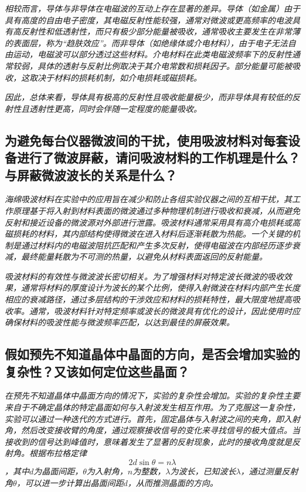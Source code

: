 \documentclass[UTF-8,twoside,cs4size]{ctexart}
\begin{document}
\textit{相较而言，导体与非导体在电磁波的互动上存在显著的差异。导体（如金属）由于具有高度的自由电子密度，其电磁反射性能较强，通常对微波或更高频率的电波具有高反射性和低透射性，而只有极少部分能量被吸收，通常吸收主要发生在非常薄的表面层，称为“趋肤效应”。而非导体（如绝缘体或介电材料），由于电子无法自由运动，电磁波可以部分透过这些材料。介电材料在此类电磁波频率下的反射性通常较弱，具体的透射与反射比例取决于其介电常数和损耗因子。部分能量可能被吸收，这取决于材料的损耗机制，如介电损耗或磁损耗。}

\textit{因此，总体来看，导体具有极高的反射性且吸收能量极少，而非导体具有较低的反射性且透射性更高，同时会伴随一定程度的能量吸收。}

\subsection{为避免每台仪器微波间的干扰，使用吸波材料对每套设备进行了微波屏蔽，请问吸波材料的工作机理是什么？与屏蔽微波波长的关系是什么？}
\textit{海绵吸波材料在实验中的应用旨在减少和防止各组实验仪器之间的互相干扰，其工作原理基于将入射到材料表面的微波通过多种物理机制进行吸收和衰减，从而避免反射和接近设备的微波源对外部进行泄露。吸波材料通常采用具有高介电损耗或高磁损耗的材料，其内部结构使得微波在进入材料后逐渐耗散为热能。一个关键的机制是通过材料内的电磁波阻抗匹配和产生多次反射，使得电磁波在内部经历逐步衰减，最终能量耗散为不可测的热量，以避免从材料表面返回的反射能量。}

\textit{吸波材料的有效性与微波波长密切相关。为了增强材料对特定波长微波的吸收效果，通常将材料的厚度设计为波长的某个比例，使得入射微波在材料内部产生长度相应的衰减路径，通过多层结构的干涉效应和材料的损耗特性，最大限度地提高吸收率。通常，吸波材料针对特定频率或波长的微波具有优化的设计，因此使用时应确保材料的吸波性能与微波频率匹配，以达到最佳的屏蔽效果。}

\subsection{假如预先不知道晶体中晶面的方向，是否会增加实验的复杂性？又该如何定位这些晶面？}
\textit{在预先不知道晶体中晶面方向的情况下，实验的复杂性会增加。实验的复杂性主要来自于不确定晶体的特定晶面如何与入射波发生相互作用。为了克服这一复杂性，实验可以通过一种迭代的方式进行。首先，固定晶体与入射波之间的夹角，即入射角，然后改变接收臂的角度，通过观察接收信号的变化来寻找信号的极大值点。当接收到的信号达到峰值时，意味着发生了显著的反射现象，此时的接收角度就是反射角。根据布拉格定律$$2d\sin\theta=n\lambda$$，其中$d$为晶面间距，$\theta$为入射角，$n$为整数，$\lambda$为波长，已知波长$\lambda$，通过测量反射角$\theta$，可以进一步计算出晶面间距$d$，从而推测晶面的方向。}
\end{document}
